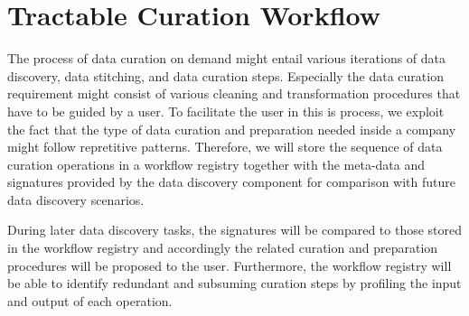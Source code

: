 \section{Tractable Curation Workflow}
\label{sec:workflow}

The process of data curation on demand might entail various iterations of data discovery, data stitching, and data curation steps. Especially the data curation requirement might consist of various cleaning and transformation procedures that have to be guided by a user. To facilitate the user in this is process, we exploit the fact that the type of data curation and preparation needed inside a company might follow repretitive patterns. 
Therefore, 
we will store the sequence of data curation operations in a workflow registry together with the meta-data and signatures provided by the data discovery component for comparison with future data discovery scenarios. 

During later data discovery tasks, the signatures will be compared to those stored in the workflow registry and accordingly the related curation and preparation procedures will be proposed to the user. Furthermore, the workflow registry will be able to identify redundant and subsuming curation steps by profiling the input and output of each operation.